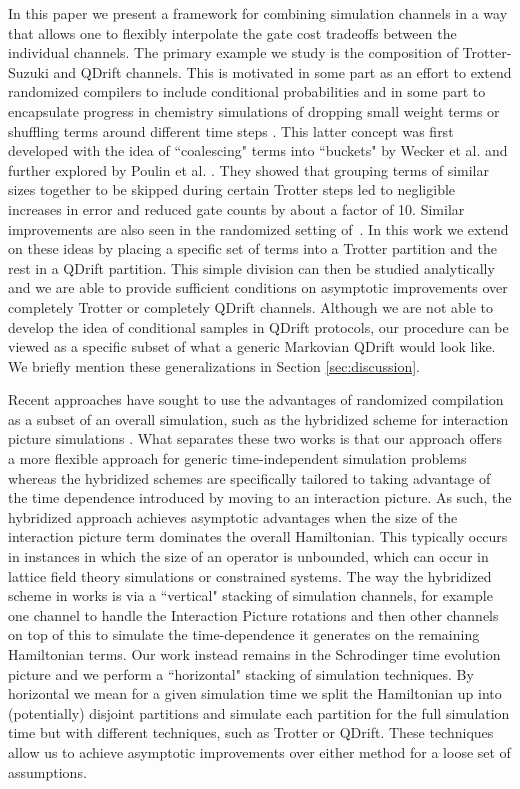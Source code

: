 In this paper we present a framework for combining simulation channels in a way that allows one to flexibly interpolate the gate cost tradeoffs between the individual channels. The primary example we study is the composition of Trotter-Suzuki and QDrift channels. This is motivated in some part as an effort to extend 
randomized compilers to include conditional probabilities and in some part to encapsulate progress in chemistry simulations of dropping small
weight terms or shuffling terms around different time steps \cite{bucket_sim}. This latter concept was first developed with the idea of ``coalescing" terms into ``buckets" by Wecker et al. \cite{bucket_sim} and further explored by Poulin et al. \cite{coalescing_con_wiebe}. They showed that grouping terms of similar sizes together to be skipped during certain Trotter steps led to negligible increases in error and reduced gate counts by about a factor of 10.  Similar improvements are also seen in the randomized setting of~\cite{kivlichan2019phase}. In this work we extend on these ideas by placing a specific set of terms into a Trotter partition and the rest in a QDrift partition. This simple division can then be studied analytically and we are able to provide sufficient conditions on asymptotic improvements over completely Trotter or completely QDrift channels. Although we are not able to develop the idea of conditional samples in QDrift protocols, our 
procedure can be viewed as a specific subset of what a generic Markovian QDrift would look like. We briefly mention these generalizations in 
Section \ref*{sec:discussion}. 
 
Recent approaches have sought to use the advantages of randomized compilation as a subset of an overall simulation, such as the hybridized
scheme for interaction picture simulations \cite{hybridized_interaction_pic}. What separates these two works is that our approach offers a
more flexible approach for generic time-independent simulation problems whereas the hybridized schemes are specifically tailored to taking
advantage of the time dependence introduced by moving to an interaction picture. As such, the hybridized approach achieves asymptotic advantages
when the size of the interaction picture term dominates the overall Hamiltonian. This typically occurs in instances in which the size of an operator
is unbounded, which can occur in lattice field theory simulations or constrained systems. The way the hybridized scheme in 
\cite{hybridized_interaction_pic} works is via a ``vertical" stacking of simulation
channels, for example one channel to handle the Interaction Picture rotations and then other channels on top of this to simulate the time-dependence it generates on the remaining Hamiltonian terms. Our work instead remains in the Schrodinger time evolution picture and we 
perform a ``horizontal" stacking of simulation techniques. By horizontal we mean for a given simulation time we split the Hamiltonian up into 
(potentially) disjoint partitions and simulate each partition for the full simulation time but with different techniques, such as Trotter or QDrift.
These techniques allow us to achieve asymptotic improvements over either method for a loose set of assumptions.

